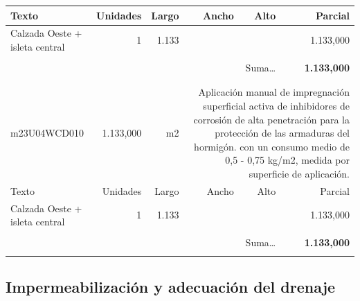 \documentclass{book}%
\begin{document}
\begin{longtable}{lrrrrr}
Texto&Unidades&Largo&Ancho&Alto&Parcial\\%
\hline%
\multicolumn{1}{p{3.5cm}}{Calzada Oeste + isleta central}&1&1.133&&& 1.133,000\\%
&&&&&\\%
\multicolumn{5}{r}{Suma\ldots}&\textbf{ 1.133,000}\\%
\hline%
&&&&&\\%
&&&&&\\%
m23U04WCD010& 1.133,000& m2&\multicolumn{3}{p{6cm}}{\scriptsize Aplicación manual de impregnación superficial activa de inhibidores de corrosión de alta penetración para la protección de las armaduras del hormigón. con un consumo medio de 0,5 - 0,75 kg/m2, medida por superficie de aplicación.\normalsize}\\%
Texto&Unidades&Largo&Ancho&Alto&Parcial\\%
\hline%
\multicolumn{1}{p{3.5cm}}{Calzada Oeste + isleta central}&1&1.133&&& 1.133,000\\%
&&&&&\\%
\multicolumn{5}{r}{Suma\ldots}&\textbf{ 1.133,000}\\%
\hline%
&&&&&\\%
\end{longtable}%
\newpage

%
\subsection{Impermeabilización y adecuación del drenaje}%
\end{document}
